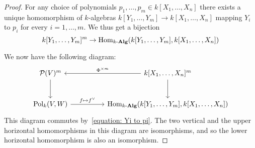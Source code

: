 \begin{proof}
  For any choice of polynomials $p_1, \dotsc, p_m \in k[X_1, \dotsc, X_n]$ there exists a unique homomorphism of $k$-algebras $k[Y_1, \dotsc, Y_m] \to k[X_1, \dotsc, X_n]$ mapping $Y_i$ to $p_i$ for every $i = 1, \dotsc, m$.
  We thus get a bijection
  \[
        k[Y_1, \dotsc, Y_m]^m
    \to \operatorname{Hom}_{k\text{-}\mathbf{Alg}}( k[Y_1, \dotsc, Y_m], k[X_1, \dotsc, X_n] )
  \]
  
  We now have the following diagram:
  \[
    \begin{tikzcd}[row sep = large, column sep = huge]
        \mc{P}(V)^m
        \arrow{d}
      & k[X_1, \dotsc, X_n]^m
        \arrow{l}[above]{\Phi^{\times m}}
        \arrow{d}
      \\
        \Pol_k(V,W)
        \arrow{r}[above]{f \mapsto f^\vee}
      & \Hom_{\cAlg{k}}( k[Y_1, \dotsc, Y_m], k[X_1, \dotsc, X_n] )
    \end{tikzcd}
  \]
  This diagram commutes by~\eqref{equation: Yi to pi}.
  The two vertical and the upper horizontal homomorphisms in this diagram are isomorphisms, and so the lower horizontal homomorphism is also an isomorphism.
\end{proof}




